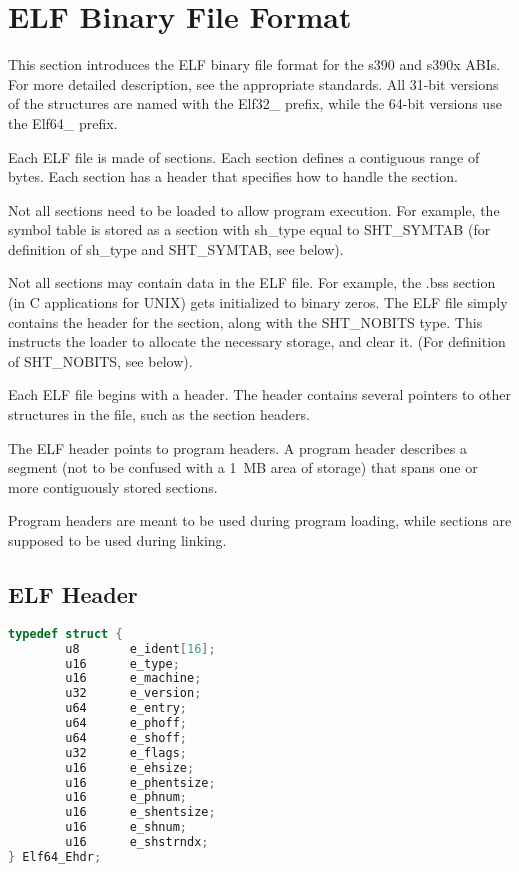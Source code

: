 \section{ELF Binary File Format}
\label{sec:elf}
This section introduces the ELF binary file format for the \cbstart s390 and
s390x ABIs\cbend.  For more detailed description, see the appropriate
standards.  \cbstart All \mbox{31-bit} versions of the structures are named
with the \mbox{Elf32\_} prefix, while the \mbox{64-bit} versions use the
\mbox{Elf64\_} prefix.\cbend

\cbstart
Each ELF file is made of sections.  Each section defines a contiguous range
of bytes.  Each section has a header that specifies how to handle the
section.

Not all sections need to be loaded to allow program execution.  For example,
the symbol table is stored as a section with sh\_type equal to SHT\_SYMTAB
(for definition of sh\_type and SHT\_SYMTAB, see below).

Not all sections may contain data in the ELF file.  For example, the .bss
section (in C applications for UNIX) gets initialized to binary zeros.  The
ELF file simply contains the header for the section, along with the
SHT\_NOBITS type.  This instructs the loader to allocate the necessary
storage, and clear it.  (For definition of SHT\_NOBITS, see below).

Each ELF file begins with a header.  The header contains several pointers to
other structures in the file, such as the section headers.

The ELF header points to program headers.  A program header describes a
segment (not to be confused with a 1~MB area of storage) that spans one or
more contiguously stored sections.

Program headers are meant to be used during program loading, while sections
are supposed to be used during linking.
\cbend

\cbstart
\subsection{ELF Header}
\cbend

\cbdelete
\begin{lstlisting}[language=C]
typedef struct {
        u8       e_ident[16];
        u16      e_type;
        u16      e_machine;
        u32      e_version;
        u64      e_entry;
        u64      e_phoff;
        u64      e_shoff;
        u32      e_flags;
        u16      e_ehsize;
        u16      e_phentsize;
        u16      e_phnum;
        u16      e_shentsize;
        u16      e_shnum;
        u16      e_shstrndx;
} Elf64_Ehdr;
\end{lstlisting}

